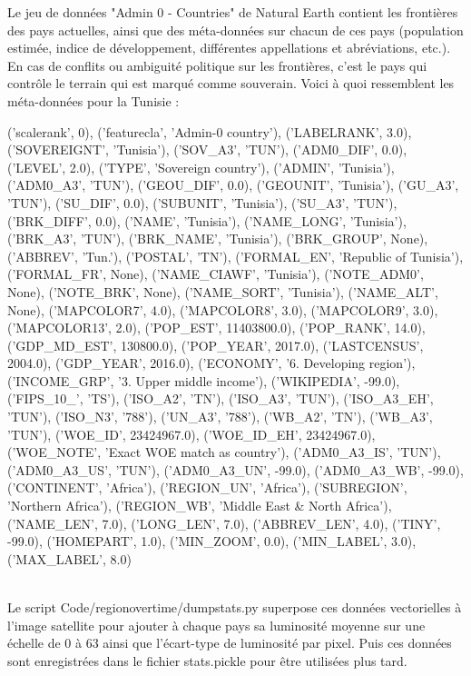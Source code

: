 \documentclass[a4paper, 11pt]{report}
\begin{document}
Le jeu de données "Admin 0 - Countries" de Natural Earth \cite{naturalearthdata} contient les frontières des pays actuelles, ainsi que des méta-données sur chacun de ces pays (population estimée, indice de développement, différentes appellations et abréviations, etc.). En cas de conflits ou ambiguité politique sur les frontières, c'est le pays qui contrôle le terrain qui est marqué comme souverain. Voici à quoi ressemblent les méta-données pour la Tunisie :\\
\begin{minipage}[t]{1.0\textwidth}
			{('scalerank', 0), ('featurecla', 'Admin-0 country'), ('LABELRANK', 3.0), ('SOVEREIGNT', 'Tunisia'), ('SOV\_A3', 'TUN'), ('ADM0\_DIF', 0.0), ('LEVEL', 2.0), ('TYPE', 'Sovereign country'), ('ADMIN', 'Tunisia'), ('ADM0\_A3', 'TUN'), ('GEOU\_DIF', 0.0), ('GEOUNIT', 'Tunisia'), ('GU\_A3', 'TUN'), ('SU\_DIF', 0.0), ('SUBUNIT', 'Tunisia'), ('SU\_A3', 'TUN'), ('BRK\_DIFF', 0.0), ('NAME', 'Tunisia'), ('NAME\_LONG', 'Tunisia'), ('BRK\_A3', 'TUN'), ('BRK\_NAME', 'Tunisia'), ('BRK\_GROUP', None), ('ABBREV', 'Tun.'), ('POSTAL', 'TN'), ('FORMAL\_EN', 'Republic of Tunisia'), ('FORMAL\_FR', None), ('NAME\_CIAWF', 'Tunisia'), ('NOTE\_ADM0', None), ('NOTE\_BRK', None), ('NAME\_SORT', 'Tunisia'), ('NAME\_ALT', None), ('MAPCOLOR7', 4.0), ('MAPCOLOR8', 3.0), ('MAPCOLOR9', 3.0), ('MAPCOLOR13', 2.0), ('POP\_EST', 11403800.0), ('POP\_RANK', 14.0), ('GDP\_MD\_EST', 130800.0), ('POP\_YEAR', 2017.0), ('LASTCENSUS', 2004.0), ('GDP\_YEAR', 2016.0), ('ECONOMY', '6. Developing region'), ('INCOME\_GRP', '3. Upper middle income'), ('WIKIPEDIA', -99.0), ('FIPS\_10\_', 'TS'), ('ISO\_A2', 'TN'), ('ISO\_A3', 'TUN'), ('ISO\_A3\_EH', 'TUN'), ('ISO\_N3', '788'), ('UN\_A3', '788'), ('WB\_A2', 'TN'), ('WB\_A3', 'TUN'), ('WOE\_ID', 23424967.0), ('WOE\_ID\_EH', 23424967.0), ('WOE\_NOTE', 'Exact WOE match as country'), ('ADM0\_A3\_IS', 'TUN'), ('ADM0\_A3\_US', 'TUN'), ('ADM0\_A3\_UN', -99.0), ('ADM0\_A3\_WB', -99.0),	 ('CONTINENT', 'Africa'), ('REGION\_UN', 'Africa'), ('SUBREGION', 'Northern Africa'), ('REGION\_WB', 'Middle East \& North Africa'), ('NAME\_LEN', 7.0), ('LONG\_LEN', 7.0), ('ABBREV\_LEN', 4.0), ('TINY', -99.0), ('HOMEPART', 1.0), ('MIN\_ZOOM', 0.0), ('MIN\_LABEL', 3.0), ('MAX\_LABEL', 8.0)}
\end{minipage}\\

Le script Code/regionovertime/dumpstats.py superpose ces données vectorielles à l'image satellite pour ajouter à chaque pays sa luminosité moyenne sur une échelle de 0 à 63 ainsi que l'écart-type de luminosité par pixel. Puis ces données sont enregistrées dans le fichier stats.pickle pour être utilisées plus tard.
\end{document}
